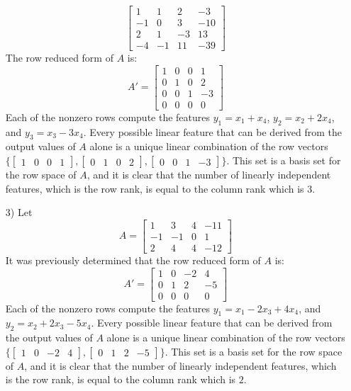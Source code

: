 \documentclass{article}
\begin{document}
\begin{itemize}
\[\begin{bmatrix}
 1 &   1 &  2  &  -3 \\
-1 &   0 &  3 & -10 \\
 2 &   1 & -3 &  13 \\
-4 & -1 & 11 & -39
\end{bmatrix}\]
The row reduced form of \(A\) is:
\[A' = \begin{bmatrix}
1 & 0 & 0 &  1 \\
0 & 1 & 0 &  2 \\
0 & 0 & 1 & -3 \\
0 & 0 & 0 &  0
\end{bmatrix}\]
Each of the nonzero rows compute the features \(y_1 = x_1 + x_4\), \(y_2 = x_2 + 2x_4\), and \(y_3 = x_3 - 3x_4\). Every possible linear feature that can be derived from the output values of \(A\) alone is a unique linear combination of the row vectors \(\{\begin{bmatrix} 1 & 0 & 0 & 1 \end{bmatrix}, \begin{bmatrix} 0 & 1 & 0 & 2 \end{bmatrix}, \begin{bmatrix} 0 & 0 & 1 & -3 \end{bmatrix}\}\). This set is a basis set for the row space of \(A\), and it is clear that the number of linearly independent features, which is the row rank, is equal to the column rank which is \(3\).
\item[3)] Let \[A = \begin{bmatrix}
 1 &  3 &  4 & -11 \\
-1 & -1 & 0 &    1 \\
 2 &  4 & 4 & -12 
\end{bmatrix}\]
It was previously determined that the row reduced form of \(A\) is: 
\[A' = \begin{bmatrix}
1 & 0 & -2 &  4 \\
0 & 1 &  2 & -5 \\
0 & 0 &  0 &  0 
\end{bmatrix}\]
Each of the nonzero rows compute the features \(y_1 = x_1 - 2x_3 + 4x_4\), and \(y_2 = x_2 + 2x_3 - 5x_4\). Every possible linear feature that can be derived from the output values of \(A\) alone is a unique linear combination of the row vectors \(\{\begin{bmatrix} 1 & 0 & -2 & 4 \end{bmatrix}, \begin{bmatrix} 0 & 1 & 2 & -5 \end{bmatrix}\}\). This set is a basis set for the row space of \(A\), and it is clear that the number of linearly independent features, which is the row rank, is equal to the column rank which is \(2\).

\end{itemize}
\end{document}
